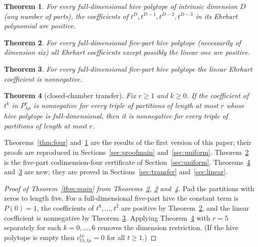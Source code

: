 \documentclass[11pt]{amsart}
\newtheorem{theorem}{Theorem}
\theoremstyle{definition}
\newcommand{\lam}{\lambda}
\begin{document}
\begin{theorem}\label{thm:topfour}
For every full-dimensional hive polytope of intrinsic dimension $D$ (any number
of parts), the coefficients of $t^{D},t^{D-1},t^{D-2},t^{D-3}$ in its Ehrhart
polynomial are positive.
\end{theorem}

\begin{theorem}\label{thm:sidefive}
For every full-dimensional five-part hive polytope (necessarily of dimension
six) all Ehrhart coefficients except possibly the linear one are positive.
\end{theorem}

\begin{theorem}\label{thm:linear}
For every full-dimensional five-part hive polytope the linear Ehrhart
coefficient is nonnegative.
\end{theorem}

\begin{theorem}[closed-chamber transfer]\label{thm:transfer}
Fix $r\ge 1$ and $k\ge 0$. If the coefficient of $t^{k}$ in $P^{\nu}_{\lam\mu}$
is nonnegative for every triple of partitions of length at most $r$ whose hive
polytope is full-dimensional, then it is nonnegative for every triple of
partitions of length at most $r$.
\end{theorem}

Theorems~\ref{thm:four} and~\ref{thm:topfour} are the results of the first
version of this paper; their proofs are reproduced in
Sections~\ref{sec:proofmain} and~\ref{sec:uniform}. Theorem~\ref{thm:sidefive}
is the five-part codimension-four certificate of Section~\ref{sec:uniform}.
Theorems~\ref{thm:transfer} and~\ref{thm:linear} are new; they are proved in
Sections~\ref{sec:transfer} and~\ref{sec:linear}.

\begin{proof}[Proof of Theorem~\ref{thm:main} from Theorems~\ref{thm:sidefive},
\ref{thm:linear} and~\ref{thm:transfer}]
Pad the partitions with zeros to length five. For a full-dimensional five-part
hive the constant term is $P(0)=1$, the coefficients of $t^{6},\dots,t^{2}$ are
positive by Theorem~\ref{thm:sidefive}, and the linear coefficient is
nonnegative by Theorem~\ref{thm:linear}. Applying Theorem~\ref{thm:transfer}
with $r=5$ separately for each $k=0,\dots,6$ removes the dimension restriction.
(If the hive polytope is empty then $c^{t\nu}_{t\lam,t\mu}=0$ for all $t\ge1$.)
\end{proof}
\end{document}
